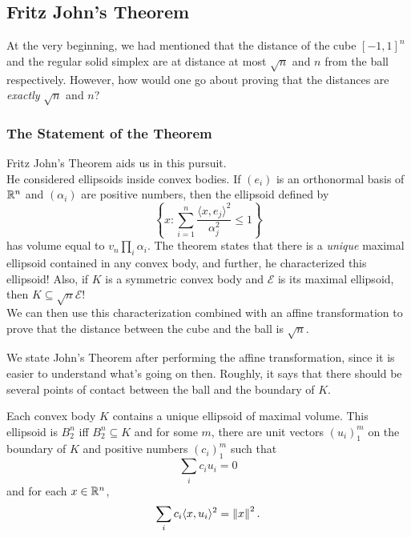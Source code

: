 \subsection{Fritz John's Theorem}

At the very beginning, we had mentioned that the distance of the cube $[-1,1]^n$ and the regular solid simplex are at distance at most $\sqrt{n}$ and $n$ from the ball respectively. However, how would one go about proving that the distances are \textit{exactly} $\sqrt{n}$ and $n$?\\

\subsubsection{The Statement of the Theorem}

Fritz John's Theorem aids us in this pursuit.\\
He considered ellipsoids inside convex bodies. If $(e_i)$ is an orthonormal basis of $\mathbb{R}^n$ and $(\alpha_i)$ are positive numbers, then the ellipsoid defined by
\[ \left\{x:\sum_{i=1}^n \frac{\langle x,e_j\rangle^2}{\alpha_j^2}\leq 1\right\} \]
has volume equal to $v_n\prod_i \alpha_i$. The theorem states that there is a \textit{unique} maximal ellipsoid contained in any convex body, and further, he characterized this ellipsoid! Also, if $K$ is a symmetric convex body and $\mathcal{E}$ is its maximal ellipsoid, then $K\subseteq\sqrt{n}\mathcal{E}$!\\
We can then use this characterization combined with an affine transformation to prove that the distance between the cube and the ball is $\sqrt{n}$.

We state John's Theorem after performing the affine transformation, since it is easier to understand what's going on then. Roughly, it says that there should be several points of contact between the ball and the boundary of $K$.

\begin{ftheo}
\label{fritz john's theorem}
Each convex body $K$ contains a unique ellipsoid of maximal volume. This ellipsoid is $B_2^n$ iff $B_2^n\subseteq K$ and for some $m$, there are unit vectors $(u_i)_1^m$ on the boundary of $K$ and positive numbers $(c_i)_1^m$ such that
\begin{equation}
\label{eqn fritz john lin dep}
    \sum_i c_i u_i = 0
\end{equation}
and for each $x\in\mathbb{R}^n$,
\begin{equation}
\label{eqn fritz john subspace contraction}
    \sum_i c_i\langle x, u_i\rangle^2 = \left\lVert x\right\rVert^2.
\end{equation}
\end{ftheo}

